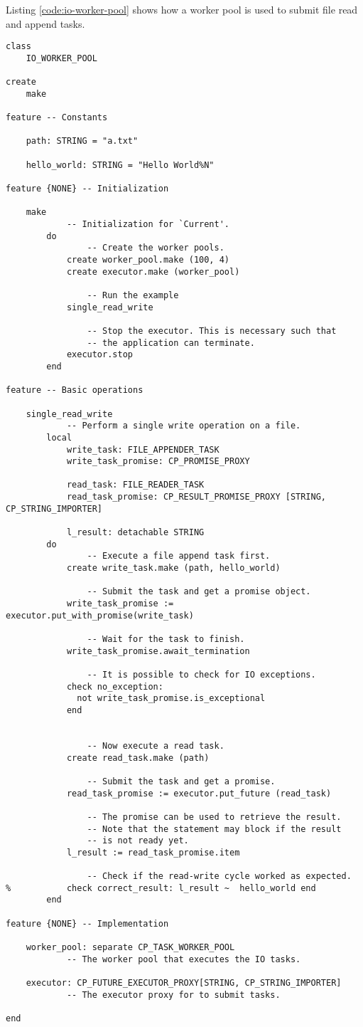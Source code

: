 Listing \ref{code:io-worker-pool} shows how a worker pool is used to submit file read and append tasks.

\begin{lstlisting}[language=OOSC2Eiffel, label={code:io-worker-pool}, captionpos=b, caption={Using a worker pool for futures and asynchronous tasks.}]
class
	IO_WORKER_POOL

create
	make

feature -- Constants

	path: STRING = "a.txt"
	
	hello_world: STRING = "Hello World%N"

feature {NONE} -- Initialization

	make
			-- Initialization for `Current'.
		do
				-- Create the worker pools.
			create worker_pool.make (100, 4)
			create executor.make (worker_pool)

				-- Run the example
			single_read_write

				-- Stop the executor. This is necessary such that 
				-- the application can terminate.
			executor.stop
		end

feature -- Basic operations

	single_read_write
			-- Perform a single write operation on a file.
		local
			write_task: FILE_APPENDER_TASK
			write_task_promise: CP_PROMISE_PROXY

			read_task: FILE_READER_TASK
			read_task_promise: CP_RESULT_PROMISE_PROXY [STRING, CP_STRING_IMPORTER]

			l_result: detachable STRING
		do
				-- Execute a file append task first.
			create write_task.make (path, hello_world)

				-- Submit the task and get a promise object.
			write_task_promise := executor.put_with_promise(write_task)

				-- Wait for the task to finish.
			write_task_promise.await_termination

				-- It is possible to check for IO exceptions.
			check no_exception: 
			  not write_task_promise.is_exceptional 
			end


				-- Now execute a read task.
			create read_task.make (path)

				-- Submit the task and get a promise.
			read_task_promise := executor.put_future (read_task)

				-- The promise can be used to retrieve the result.
				-- Note that the statement may block if the result
				-- is not ready yet.
			l_result := read_task_promise.item

				-- Check if the read-write cycle worked as expected.
% 			check correct_result: l_result ~  hello_world end
		end

feature {NONE} -- Implementation

	worker_pool: separate CP_TASK_WORKER_POOL
			-- The worker pool that executes the IO tasks.

	executor: CP_FUTURE_EXECUTOR_PROXY[STRING, CP_STRING_IMPORTER]
			-- The executor proxy for to submit tasks.

end
\end{lstlisting}

